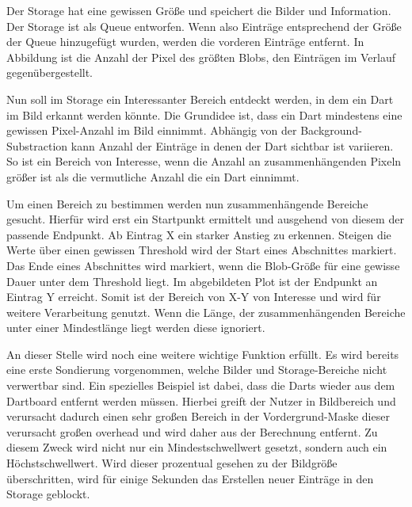 Der Storage hat eine gewissen Größe und speichert die Bilder und Information. Der Storage ist als Queue entworfen. Wenn also Einträge entsprechend der Größe der Queue hinzugefügt wurden, werden die vorderen Einträge entfernt. In Abbildung  ist die Anzahl der Pixel des größten Blobs, den Einträgen im Verlauf gegenübergestellt.

Nun soll im Storage ein Interessanter Bereich entdeckt werden, in dem ein Dart im Bild erkannt werden könnte. Die Grundidee ist, dass ein Dart mindestens eine gewissen Pixel-Anzahl im Bild einnimmt. Abhängig von der Background-Substraction kann Anzahl der Einträge in denen der Dart sichtbar ist variieren. So ist ein Bereich von Interesse, wenn die Anzahl an zusammenhängenden Pixeln größer ist als die vermutliche Anzahl die ein Dart einnimmt.

Um einen Bereich zu bestimmen werden nun zusammenhängende Bereiche gesucht. Hierfür wird erst ein Startpunkt ermittelt und ausgehend von diesem der passende Endpunkt.
Ab Eintrag X  ein starker Anstieg zu erkennen. Steigen die Werte über einen gewissen Threshold wird der Start eines Abschnittes markiert. Das Ende eines Abschnittes wird markiert, wenn die Blob-Größe für eine gewisse Dauer unter dem Threshold liegt. Im abgebildeten Plot ist der Endpunkt an Eintrag Y  erreicht. Somit ist der Bereich von X-Y von Interesse und wird für weitere Verarbeitung genutzt. 
Wenn die Länge, der zusammenhängenden Bereiche unter einer Mindestlänge liegt werden diese ignoriert.

An dieser Stelle wird noch eine weitere wichtige Funktion erfüllt. Es wird bereits eine erste Sondierung vorgenommen, welche Bilder und Storage-Bereiche nicht verwertbar sind. 
Ein spezielles Beispiel ist dabei, dass die Darts wieder aus dem Dartboard entfernt werden müssen. Hierbei greift der Nutzer in Bildbereich und verursacht dadurch einen sehr großen Bereich in der Vordergrund-Maske dieser verursacht großen overhead und wird daher aus der Berechnung entfernt. Zu diesem Zweck wird nicht nur ein Mindestschwellwert gesetzt, sondern auch ein Höchstschwellwert. Wird dieser prozentual gesehen zu der Bildgröße überschritten, wird für einige Sekunden das Erstellen neuer Einträge in den Storage geblockt.

